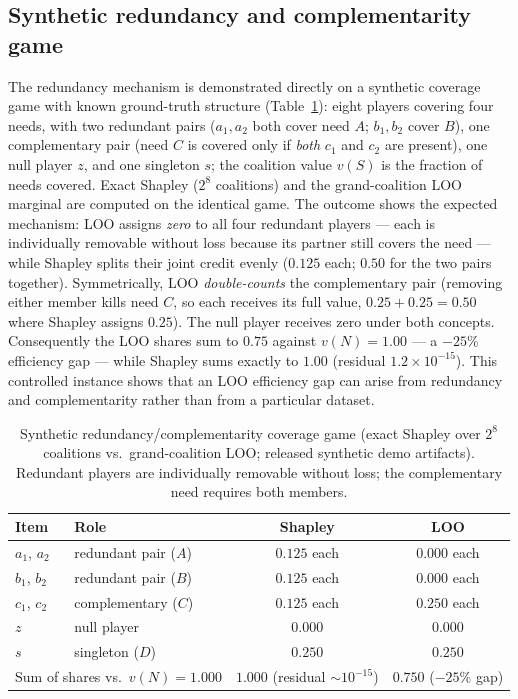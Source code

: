 \documentclass[pdflatex,sn-mathphys-num]{sn-jnl}
\begin{document}
\subsection{Synthetic redundancy and complementarity game}\label{subsec:redundancy_demo}

The redundancy mechanism is demonstrated directly on a synthetic coverage game with known ground-truth structure (Table~\ref{tab:redundancy_demo}): eight players covering four needs, with two redundant pairs ($a_1,a_2$ both cover need $A$; $b_1,b_2$ cover $B$), one complementary pair (need $C$ is covered only if \emph{both} $c_1$ and $c_2$ are present), one null player $z$, and one singleton $s$; the coalition value $v(S)$ is the fraction of needs covered. Exact Shapley ($2^8$ coalitions) and the grand-coalition LOO marginal are computed on the identical game. The outcome shows the expected mechanism: LOO assigns \emph{zero} to all four redundant players --- each is individually removable without loss because its partner still covers the need --- while Shapley splits their joint credit evenly ($0.125$ each; $0.50$ for the two pairs together). Symmetrically, LOO \emph{double-counts} the complementary pair (removing either member kills need $C$, so each receives its full value, $0.25+0.25=0.50$ where Shapley assigns $0.25$). The null player receives zero under both concepts. Consequently the LOO shares sum to $0.75$ against $v(N)=1.00$ --- a $-25\%$ efficiency gap --- while Shapley sums exactly to $1.00$ (residual $1.2\times10^{-15}$). This controlled instance shows that an LOO efficiency gap can arise from redundancy and complementarity rather than from a particular dataset.

\begin{table}[t]
\caption{Synthetic redundancy/complementarity coverage game (exact Shapley over $2^8$ coalitions vs.\ grand-coalition LOO; released synthetic demo artifacts). Redundant players are individually removable without loss; the complementary need requires both members.}\label{tab:redundancy_demo}
\centering
\small
\begin{tabular}{llcc}
\toprule
Item & Role & Shapley & LOO \\
\midrule
$a_1$, $a_2$ & redundant pair ($A$)   & $0.125$ each & $0.000$ each \\
$b_1$, $b_2$ & redundant pair ($B$)   & $0.125$ each & $0.000$ each \\
$c_1$, $c_2$ & complementary ($C$)    & $0.125$ each & $0.250$ each \\
$z$          & null player            & $0.000$      & $0.000$ \\
$s$          & singleton ($D$)        & $0.250$      & $0.250$ \\
\midrule
\multicolumn{2}{l}{Sum of shares vs.\ $v(N)=1.000$} & $1.000$ (residual $\sim10^{-15}$) & $0.750$ ($-25\%$ gap) \\
\bottomrule
\end{tabular}
\end{table}
\end{document}

